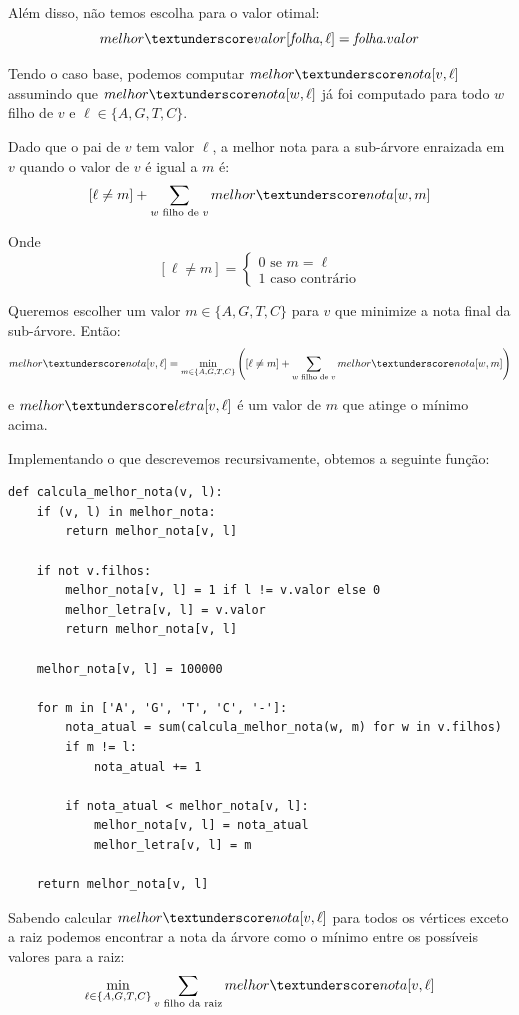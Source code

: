\documentclass[11pt]{article}
\newcommand{\tu}{\textunderscore}
\begin{document}
Além disso, não temos escolha para o valor otimal:
\[ melhor \tu valor[\textit{folha}, \ell] = \textit{folha}.valor \]

Tendo o caso base, podemos computar $melhor \tu nota[v, \ell]$
assumindo que $melhor \tu nota[w, \ell]$ já foi computado para todo
$w$ filho de $v$ e $\ell \in \{A, G, T, C\}$.

Dado que o pai de $v$ tem valor $\ell$, a melhor nota para a
sub-árvore enraizada em $v$ quando o valor de $v$ é igual a $m$ é:
\[ [\ell \neq m] + \sum_{w \text{ filho de }v} melhor \tu nota[w, m]\]

Onde \[[\ell \neq m] =  \begin{cases} 0 \text{ se } m = \ell \\
                                      1 \text{ caso contrário}\end{cases}\]

Queremos escolher um valor $m \in \{A, G, T, C\}$ para $v$
que minimize a nota final da sub-árvore. Então:
\[melhor \tu nota[v, \ell] = \min_{m \in \{A, G, T, C\}} \left([\ell
\neq m] + \sum_{w \text{ filho de }v} melhor \tu nota[w, m]\right)\]

e $melhor\tu letra[v, \ell]$ é um valor de $m$ que atinge o mínimo
acima.

Implementando o que descrevemos recursivamente, obtemos a seguinte
função:
\begin{verbatim}
def calcula_melhor_nota(v, l):
    if (v, l) in melhor_nota:
        return melhor_nota[v, l]

    if not v.filhos:
        melhor_nota[v, l] = 1 if l != v.valor else 0
        melhor_letra[v, l] = v.valor
        return melhor_nota[v, l]

    melhor_nota[v, l] = 100000

    for m in ['A', 'G', 'T', 'C', '-']:
        nota_atual = sum(calcula_melhor_nota(w, m) for w in v.filhos)
        if m != l:
            nota_atual += 1

        if nota_atual < melhor_nota[v, l]:
            melhor_nota[v, l] = nota_atual
            melhor_letra[v, l] = m

    return melhor_nota[v, l]
\end{verbatim}

Sabendo calcular $melhor \tu nota[v, \ell]$ para todos os vértices
exceto a raiz podemos encontrar a nota da árvore como o mínimo entre
os possíveis valores para a raiz:
\[ \min_{\ell \in \{A, G, T, C\}} \sum_{v \text{ filho da raiz}}
melhor \tu nota[v, \ell]\]
\end{document}
